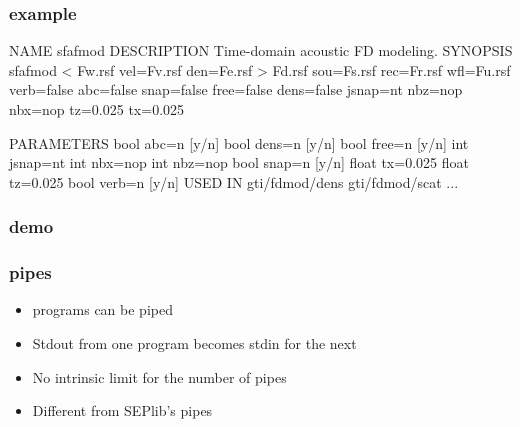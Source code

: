 \begin{frame}[fragile] \frametitle{example}

  \tiny
\begin{semiverbatim}
NAME
        sfafmod
DESCRIPTION
        Time-domain acoustic FD modeling.
SYNOPSIS
        sfafmod < Fw.rsf vel=Fv.rsf den=Fe.rsf > Fd.rsf sou=Fs.rsf rec=Fr.rsf wfl=Fu.rsf
	verb=false abc=false snap=false free=false dens=false jsnap=nt nbz=nop nbx=nop tz=0.025 tx=0.025

PARAMETERS
        bool    abc=n [y/n]
        bool    dens=n [y/n]
        bool    free=n [y/n]
        int     jsnap=nt
        int     nbx=nop
        int     nbz=nop
        bool    snap=n [y/n]
        float   tx=0.025
        float   tz=0.025
        bool    verb=n [y/n]
USED IN
        gti/fdmod/dens
        gti/fdmod/scat
	...
\end{semiverbatim}
\end{frame}
\cwpnote{}

\begin{frame}  \frametitle{demo}


\end{frame}
\cwpnote{}

\begin{frame} \frametitle{pipes}

  \begin{itemize}
  \item \mg programs can be piped
  \item Stdout from one program becomes stdin for the next
  \item No intrinsic limit for the number of pipes
  \item Different from SEPlib's pipes
  \end{itemize}
  
\end{frame}
\cwpnote{}

